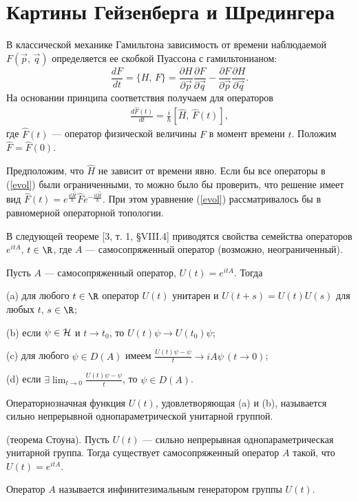 \documentclass[a4paper
]{article}
\begin{document}
\section{Картины Гейзенберга и Шредингера}
В классической механике Гамильтона зависимость от времени наблюдаемой
$F(\vec{p}, \, \vec{q})$ определяется ее скобкой Пуассона с гамильтонианом:
$$\frac{dF}{dt}=\{H, \, F\}=\frac{\partial H}{\partial\vec{p}}
\frac{\partial F}{\partial\vec{q}}-\frac{\partial F}{\partial\vec{p}}
\frac{\partial H}{\partial\vec{q}}.$$ На основании принципа соответствия
получаем для операторов
\begin{align}
\label{evol}
\frac{d\hat{F}(t)}{dt}=\frac{i}{\hbar}[\hat{H}, \, \hat{F}(t)],
\end{align}
где $\hat{F}(t)$ --- оператор физической величины $F$ в момент
времени $t$. Положим $\hat{F}=\hat{F}(0)$. \par
Предположим, что $\hat H$ не зависит от времени явно.
Если бы все операторы в (\ref{evol}) были ограниченными, то можно было
бы проверить, что решение имеет вид $\hat F(t)=e^{\frac{it\hat H}{\hbar}}\hat Fe^{-\frac{it
\hat H}{\hbar}}$. При этом уравнение (\ref{evol}) рассматривалось бы в равномерной
операторной топологии. \par
В следующей теореме [3, т. 1, \S VIII.4] приводятся свойства семейства
операторов $e^{itA}$, $t\in \R$, где $A$ --- самосопряженный оператор
(возможно, неограниченный).
\begin{Trm}
Пусть $A$ --- самосопряженный оператор, $U(t)=e^{itA}$. Тогда \par
(a) для любого $t\in \R$ оператор $U(t)$ унитарен и $U(t+s)=U(t)U(s)$
для любых $t$, $s\in \R$; \par
(b) если $\psi\in {\cal H}$ и $t\rightarrow t_0$, то $U(t)\psi\rightarrow
U(t_0)\psi$; \par
(c) для любого $\psi\in D(A)$ имеем $\frac{U(t)\psi-\psi}{t}\rightarrow
iA\psi\, (t\rightarrow 0)$; \par
(d) если $\exists \lim_{t\rightarrow 0}\frac{U(t)\psi-\psi}{t}$, то
$\psi \in D(A)$.
\end{Trm}
Операторнозначная функция $U(t)$, удовлетворяющая (a) и (b), называется
сильно непрерывной однопараметрической унитарной группой.
\begin{Trm}
(теорема Стоуна). Пусть $U(t)$ --- сильно непрерывная однопараметрическая
унитарной группа. Тогда существует самосопряженный оператор $A$ такой,
что $U(t)=e^{itA}$.
\end{Trm}
Оператор $A$ называется инфинитезимальным генератором группы $U(t)$. \par
\end{document}

